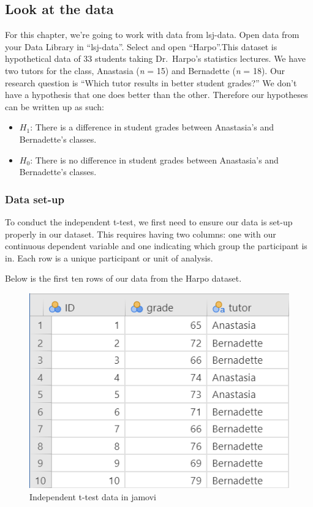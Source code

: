 \documentclass[
]{book}
\providecommand{\tightlist}{%
  \setlength{\itemsep}{0pt}\setlength{\parskip}{0pt}}
\begin{document}
\hypertarget{look-at-the-data-1}{%
\subsection{Look at the data}\label{look-at-the-data-1}}

For this chapter, we're going to work with data from lsj-data. Open data from your Data Library in ``lsj-data''. Select and open ``Harpo''.This dataset is hypothetical data of 33 students taking Dr.~Harpo's statistics lectures. We have two tutors for the class, Anastasia (\emph{n} = 15) and Bernadette (\emph{n} = 18). Our research question is ``Which tutor results in better student grades?'' We don't have a hypothesis that one does better than the other. Therefore our hypotheses can be written up as such:

\begin{itemize}
\tightlist
\item
  \(H_1\): There is a difference in student grades between Anastasia's and Bernadette's classes.
\item
  \(H_0\): There is no difference in student grades between Anastasia's and Bernadette's classes.
\end{itemize}

\hypertarget{data-set-up-1}{%
\subsubsection{Data set-up}\label{data-set-up-1}}

To conduct the independent t-test, we first need to ensure our data is set-up properly in our dataset. This requires having two columns: one with our continuous dependent variable and one indicating which group the participant is in. Each row is a unique participant or unit of analysis.

Below is the first ten rows of our data from the Harpo dataset.

\begin{figure}

{\centering \includegraphics[width=0.8\linewidth]{images/02-independent_t-test/independent_t-test_data} 

}

\caption{Independent t-test data in jamovi}\label{fig:unnamed-chunk-1}
\end{figure}
\end{document}
